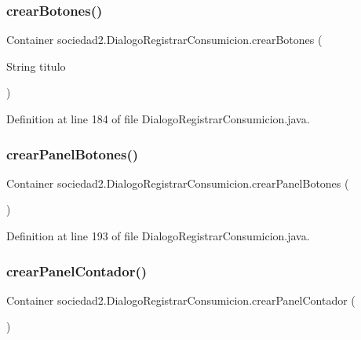 \subsubsection{\texorpdfstring{crear\+Botones()}{crearBotones()}}
{\footnotesize\ttfamily Container sociedad2.\+Dialogo\+Registrar\+Consumicion.\+crear\+Botones (\begin{DoxyParamCaption}\item[{String}]{titulo }\end{DoxyParamCaption})}



Definition at line 184 of file Dialogo\+Registrar\+Consumicion.\+java.

\mbox{\label{classsociedad2_1_1_dialogo_registrar_consumicion_a5597a3fa2f6b7e7a6b6c1c4893b2875a}} 
\subsubsection{\texorpdfstring{crear\+Panel\+Botones()}{crearPanelBotones()}}
{\footnotesize\ttfamily Container sociedad2.\+Dialogo\+Registrar\+Consumicion.\+crear\+Panel\+Botones (\begin{DoxyParamCaption}{ }\end{DoxyParamCaption})}



Definition at line 193 of file Dialogo\+Registrar\+Consumicion.\+java.

\mbox{\label{classsociedad2_1_1_dialogo_registrar_consumicion_a13951c3941ceda5aca796fea7d93d6d4}} 
\subsubsection{\texorpdfstring{crear\+Panel\+Contador()}{crearPanelContador()}}
{\footnotesize\ttfamily Container sociedad2.\+Dialogo\+Registrar\+Consumicion.\+crear\+Panel\+Contador (\begin{DoxyParamCaption}{ }\end{DoxyParamCaption})}



